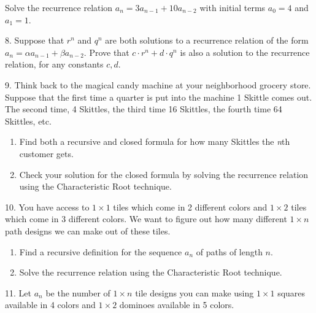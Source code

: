 \documentclass[10pt,]{book}
\theoremstyle{plain}
\theoremstyle{definition}
\theoremstyle{definition}
\theoremstyle{definition}
\theoremstyle{definition}
\numberwithin{equation}{chapter}
\begin{document}
\begin{exerciselist}
Solve the recurrence relation \(a_n = 3a_{n-1} + 10a_{n-2}\) with initial terms \(a_0 = 4\) and \(a_1 = 1\).%
\par\smallskip
\item[8.]\hypertarget{exercise-40}{}\hypertarget{p-356}{}%
Suppose that \(r^n\) and \(q^n\) are both solutions to a recurrence relation of the form \(a_n = \alpha a_{n-1} + \beta a_{n-2}\).  Prove that \(c\cdot r^n + d \cdot q^n\) is also a solution to the recurrence relation, for any constants \(c, d\).%
\par\smallskip
\item[9.]\hypertarget{exercise-41}{}\hypertarget{p-357}{}%
Think back to the magical candy machine at your neighborhood grocery store. Suppose that the first time a quarter is put into the machine 1 Skittle comes out. The second time, 4 Skittles, the third time 16 Skittles, the fourth time 64 Skittles, etc. \leavevmode%
\begin{enumerate}[label=(\alph*)]
\item\hypertarget{li-187}{}\hypertarget{p-358}{}%
Find both a recursive and closed formula for how many Skittles the \emph{n}th customer gets.%
\item\hypertarget{li-188}{}\hypertarget{p-359}{}%
Check your solution for the closed formula by solving the recurrence relation using the Characteristic Root technique.%
\end{enumerate}
%
\par\smallskip
\item[10.]\hypertarget{exercise-42}{}\hypertarget{p-360}{}%
You have access to \(1 \times 1\) tiles which come in 2 different colors and \(1\times 2\) tiles which come in 3 different colors. We want to figure out how many different \(1 \times n\) path designs we can make out of these tiles.%
\leavevmode%
\begin{enumerate}[label=(\alph*)]
\item\hypertarget{li-189}{}\hypertarget{p-361}{}%
Find a recursive definition for the sequence \(a_n\) of paths of length \(n\).%
\item\hypertarget{li-190}{}\hypertarget{p-362}{}%
Solve the recurrence relation using the Characteristic Root technique.%
\end{enumerate}
\par\smallskip
\item[11.]\hypertarget{exercise-43}{}\hypertarget{p-363}{}%
Let \(a_n\) be the number of \(1 \times n\) tile designs you can make using \(1 \times 1\) squares available in 4 colors and \(1 \times 2\) dominoes available in 5 colors.%

\end{exerciselist}
\end{document}
